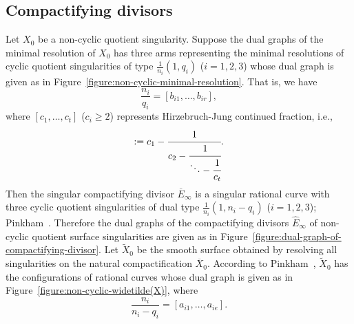 \documentclass[reqno, twoside, a4paper]{amsart}
\theoremstyle{definition}
\numberwithin{equation}{section}
\begin{document}
\subsection{Compactifying divisors}
\label{subsection:compactifying-divisor}

Let $X_0$ be a non-cyclic quotient singularity. Suppose the dual graphs of the minimal resolution of $X_0$ has three arms representing the minimal resolutions of cyclic quotient singularities of type $\frac{1}{n_i}(1,q_i)$ ($i=1,2,3$) whose dual graph is given as in Figure~\ref{figure:non-cyclic-minimal-resolution}. That is, we have
%
\begin{equation*}
\frac{n_i}{q_i} = [b_{i1}, \dotsc, b_{ir}],
\end{equation*}
%
where $[c_1, \dotsc, c_t]$ ($c_i \ge 2$) represents Hirzebruch-Jung continued fraction, i.e.,
%
\begin{equation*}
[c_1, \dotsc, c_t] := c_1 - \cfrac{1}{c_2-\cfrac{1}{\ddots - \cfrac{1}{c_t}}}.
\end{equation*}
%
Then the singular compactifying divisor $\overline{E}_{\infty}$ is a singular rational curve with three cyclic quotient singularities of dual type $\frac{1}{n_i}(1, n_i-q_i)$ ($i=1,2,3$); Pinkham~\cite{Pinkham-1977}. Therefore the dual graphs of the compactifying divisors $\widehat{E}_{\infty}$ of non-cyclic quotient surface singularities are given as in Figure~\ref{figure:dual-graph-of-compactifying-divisor}. Let $\widetilde{X}_0$ be the smooth surface obtained by resolving all singularities on the natural compactification $\overline{X}_0$. According to Pinkham~\cite{Pinkham-1977}, $\widetilde{X}_0$ has the configurations of rational curves whose dual graph is given as in Figure~\ref{figure:non-cyclic-widetilde(X)}, where
%
\begin{equation*}
\frac{n_i}{n_i-q_i} = [a_{i1}, \dotsc, a_{ie}].
\end{equation*}
\end{document}
